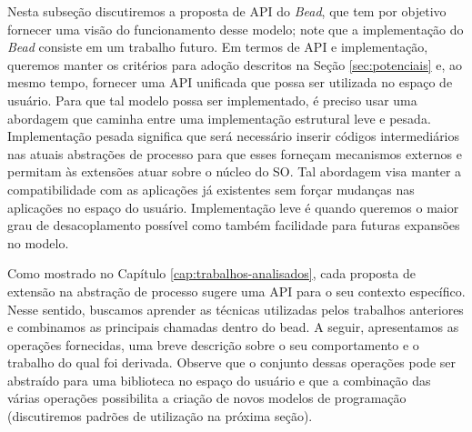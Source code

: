 Nesta subseção discutiremos a proposta de API do \emph{Bead}, que tem por
objetivo fornecer uma visão do funcionamento desse modelo; note que a
implementação do \emph{Bead} consiste em um trabalho futuro. Em termos de API e
implementação, queremos manter os critérios para adoção descritos na Seção
\ref{sec:potenciais} e, ao mesmo tempo, fornecer uma API unificada que possa
ser utilizada no espaço de usuário. Para que tal modelo possa ser implementado,
é preciso usar uma abordagem que caminha entre uma implementação estrutural
leve e pesada.  Implementação pesada significa que será necessário inserir
códigos intermediários nas atuais abstrações de processo para que esses
forneçam mecanismos externos e permitam às extensões atuar sobre o núcleo do
SO. Tal abordagem visa manter a compatibilidade com as aplicações já existentes
sem forçar mudanças nas aplicações no espaço do usuário. Implementação leve é
quando queremos o maior grau de desacoplamento possível como também facilidade
para futuras expansões no modelo.

Como mostrado no Capítulo \ref{cap:trabalhos-analisados}, cada proposta de
extensão na abstração de processo sugere uma API para o seu contexto
específico. Nesse sentido, buscamos aprender as técnicas utilizadas pelos
trabalhos anteriores e combinamos as principais chamadas dentro do bead. A
seguir, apresentamos as operações fornecidas, uma breve descrição sobre o seu
comportamento e o trabalho do qual foi derivada. Observe que o conjunto dessas
operações pode ser abstraído para uma biblioteca no espaço do usuário e que a
combinação das várias operações possibilita a criação de novos modelos de
programação (discutiremos padrões de utilização na próxima seção). 

